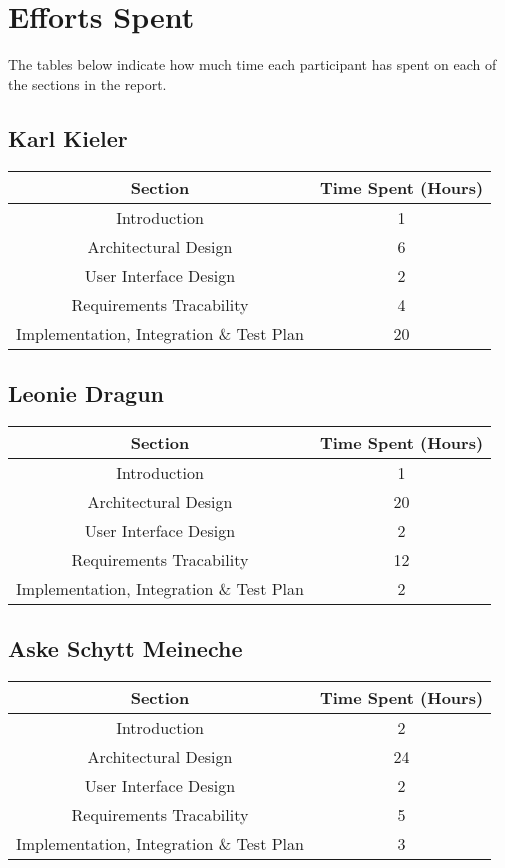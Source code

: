\clearpage
\newpage
\section{Efforts Spent}
\label{sec:effort}
The tables below indicate how much time each participant has spent on each of the sections in the report. 

\subsection{Karl Kieler}
\begin{table}[h]
\centering
\begin{tabular}{|c|c|}
\hline
Section & Time Spent (Hours) \\ \hline
Introduction & 1\\ \hline
Architectural Design& 6\\ \hline
User Interface Design& 2\\ \hline
Requirements Tracability& 4\\ \hline
Implementation, Integration \& Test Plan& 20\\ \hline
\end{tabular}
\end{table}


\subsection{Leonie Dragun}
\begin{table}[h]
\centering
\begin{tabular}{|c|c|}
\hline
Section & Time Spent (Hours) \\ \hline
Introduction & 1\\ \hline
Architectural Design& 20\\ \hline
User Interface Design& 2\\ \hline
Requirements Tracability& 12\\ \hline
Implementation, Integration \& Test Plan& 2\\ \hline
\end{tabular}
\end{table}


\subsection{Aske Schytt Meineche}
\begin{table}[h]
\centering
\begin{tabular}{|c|c|}
\hline
Section & Time Spent (Hours) \\ \hline
Introduction & 2\\ \hline
Architectural Design& 24\\ \hline
User Interface Design& 2\\ \hline
Requirements Tracability& 5\\ \hline
Implementation, Integration \& Test Plan& 3\\ \hline
\end{tabular}
\end{table}

\newpage